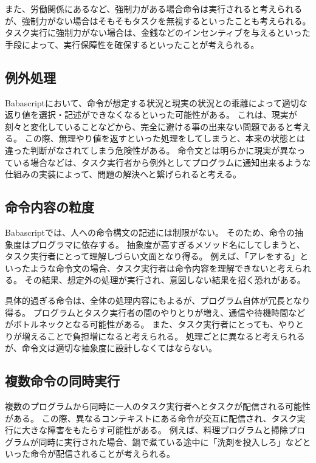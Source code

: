 \documentclass[twoside]{wiss}
\begin{document}
また、労働関係にあるなど、強制力がある場合命令は実行されると考えられるが、強制力がない場合はそもそもタスクを無視するといったことも考えられる。
タスク実行に強制力がない場合は、金銭などのインセンティブを与えるといった手段によって、実行保障性を確保するといったことが考えられる。

\subsection{例外処理}

Babascriptにおいて、命令が想定する状況と現実の状況との乖離によって適切な返り値を選択・記述ができなくなるといった可能性がある。
これは、現実が刻々と変化していることなどから、完全に避ける事の出来ない問題であると考える。
この際、無理やり値を返すといった処理をしてしまうと、本来の状態とは違った判断がなされてしまう危険性がある。
命令文とは明らかに現実が異なっている場合などは、タスク実行者から例外としてプログラムに通知出来るような仕組みの実装によって、問題の解決へと繋げられると考える。

\subsection{命令内容の粒度}

Babascriptでは、人への命令構文の記述には制限がない。
そのため、命令の抽象度はプログラマに依存する。
抽象度が高すぎるメソッド名にしてしまうと、タスク実行者にとって理解しづらい文面となり得る。
例えば、「アレをする」といったような命令文の場合、タスク実行者は命令内容を理解できないと考えられる。
その結果、想定外の処理が実行され、意図しない結果を招く恐れがある。

具体的過ぎる命令は、全体の処理内容にもよるが、プログラム自体が冗長となり得る。
プログラムとタスク実行者の間のやりとりが増え、通信や待機時間などがボトルネックとなる可能性がある。
また、タスク実行者にとっても、やりとりが増えることで負担増になると考えられる。
処理ごとに異なると考えられるが、命令文は適切な抽象度に設計しなくてはならない。


\subsection{複数命令の同時実行}

複数のプログラムから同時に一人のタスク実行者へとタスクが配信される可能性がある。
この際、異なるコンテキストにある命令が交互に配信され、タスク実行に大きな障害をもたらす可能性がある。
例えば、料理プログラムと掃除プログラムが同時に実行された場合、鍋で煮ている途中に「洗剤を投入しろ」などといった命令が配信されることが考えられる。
\end{document}
